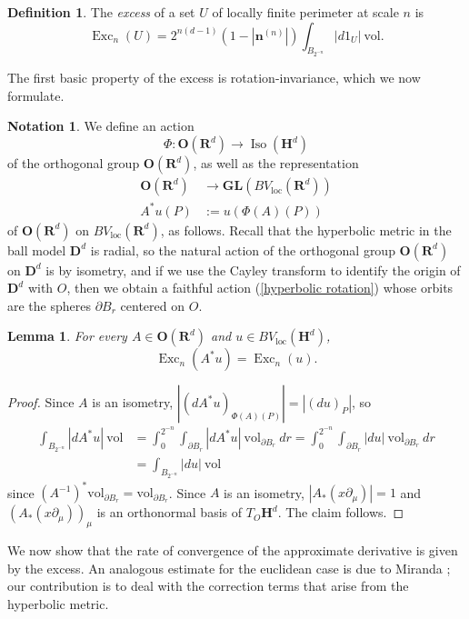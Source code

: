 \documentclass[reqno,12pt,letterpaper]{amsart}
\newcommand{\RR}{\mathbf{R}}
\newcommand{\DD}{\mathbf{D}}
\newcommand{\Hyp}{\mathbf H}
\newcommand{\GL}{\mathbf{GL}}
\newcommand{\Orth}{\mathbf{O}}
\DeclareMathOperator{\Exc}{Exc}
\DeclareMathOperator{\Iso}{Iso}
\newcommand{\normal}{\mathbf n}
\newcommand{\vol}{\mathrm{vol}}
\newcommand{\dfn}[1]{\emph{#1}\index{#1}}
\newcommand{\loc}{\mathrm{loc}}
\newtheorem{lemma}[theorem]{Lemma}
\theoremstyle{definition}
\newtheorem{definition}[theorem]{Definition}
\newtheorem{notation}[theorem]{Notation}
\numberwithin{equation}{section}
\begin{document}
\begin{definition}
The \dfn{excess} of a set $U$ of locally finite perimeter at scale $n$ is
$$\Exc_n(U) = 2^{n(d - 1)} (1 - |\normal^{(n)}|) \int_{B_{2^{-n}}} |d1_U| ~\vol.$$
\end{definition}

The first basic property of the excess is rotation-invariance, which we now formulate.

\begin{notation}
We define an action
\begin{equation}\label{hyperbolic rotation}
    \Phi: \Orth(\RR^d) \to \Iso(\Hyp^d)
\end{equation}
of the orthogonal group $\Orth(\RR^d)$, as well as the representation
\begin{align*}
\Orth(\RR^d) &\to \GL(BV_\loc(\RR^d))\\
A^* u(P) &:= u(\Phi(A)(P))
\end{align*}
of $\Orth(\RR^d)$ on $BV_\loc(\RR^d)$, as follows.
Recall that the hyperbolic metric in the ball model $\DD^d$ is radial, so the natural action of the orthogonal group $\Orth(\RR^d)$ on $\DD^d$ is by isometry, and if we use the Cayley transform to identify the origin of $\DD^d$ with $O$, then we obtain a faithful action (\ref{hyperbolic rotation}) whose orbits are the spheres $\partial B_r$ centered on $O$.
\end{notation}

\begin{lemma}\label{excess rotation invariant}
For every $A \in \Orth(\RR^d)$ and $u \in BV_\loc(\Hyp^d)$,
$$\Exc_n(A^* u) = \Exc_n(u).$$
\end{lemma}
\begin{proof}
Since $A$ is an isometry, $|(d A^* u)_{\Phi(A)(P)}| = |(du)_P|$, so
\begin{align*}
\int_{B_{2^{-n}}} |dA^*u| ~\vol &= \int_0^{2^{-n}} \int_{\partial B_r} |dA^* u| ~\vol_{\partial B_r} ~dr = \int_0^{2^{-n}} \int_{\partial B_r} |du| ~\vol_{\partial B_r} ~dr\\
&= \int_{B_{2^{-n}}} |du| ~\vol
\end{align*}
since $(A^{-1})^* \vol_{\partial B_r} = \vol_{\partial B_r}$.
Since $A$ is an isometry, $|A_* (x \partial_\mu)| = 1$ and $(A_*(x \partial_\mu))_\mu$ is an orthonormal basis of $T_O \Hyp^d$.
The claim follows.
\end{proof}

We now show that the rate of convergence of the approximate derivative is given by the excess.
An analogous estimate for the euclidean case is due to Miranda \cite[pg661]{Miranda66}; our contribution is to deal with the correction terms that arise from the hyperbolic metric.
\end{document}
